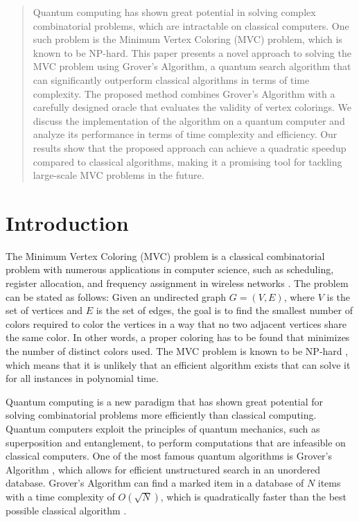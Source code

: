 \begin{abstract}
Quantum computing has shown great potential in solving complex combinatorial problems, which are intractable on classical computers. One such problem is the Minimum Vertex Coloring (MVC) problem, which is known to be NP-hard. This paper presents a novel approach to solving the MVC problem using Grover's Algorithm, a quantum search algorithm that can significantly outperform classical algorithms in terms of time complexity. The proposed method combines Grover's Algorithm with a carefully designed oracle that evaluates the validity of vertex colorings. We discuss the implementation of the algorithm on a quantum computer and analyze its performance in terms of time complexity and efficiency. Our results show that the proposed approach can achieve a quadratic speedup compared to classical algorithms, making it a promising tool for tackling large-scale MVC problems in the future.
\end{abstract}

\section{Introduction}

The Minimum Vertex Coloring (MVC) problem is a classical combinatorial problem with numerous applications in computer science, such as scheduling, register allocation, and frequency assignment in wireless networks \cite{garey1979computers}. The problem can be stated as follows: Given an undirected graph $G = (V, E)$, where $V$ is the set of vertices and $E$ is the set of edges, the goal is to find the smallest number of colors required to color the vertices in a way that no two adjacent vertices share the same color. In other words, a proper coloring has to be found that minimizes the number of distinct colors used. The MVC problem is known to be NP-hard \cite{karp1972reducibility}, which means that it is unlikely that an efficient algorithm exists that can solve it for all instances in polynomial time.

Quantum computing is a new paradigm that has shown great potential for solving combinatorial problems more efficiently than classical computing. Quantum computers exploit the principles of quantum mechanics, such as superposition and entanglement, to perform computations that are infeasible on classical computers. One of the most famous quantum algorithms is Grover's Algorithm \cite{grover1996fast}, which allows for efficient unstructured search in an unordered database. Grover's Algorithm can find a marked item in a database of $N$ items with a time complexity of $O(\sqrt{N})$, which is quadratically faster than the best possible classical algorithm \cite{bennett1997strengths}.

